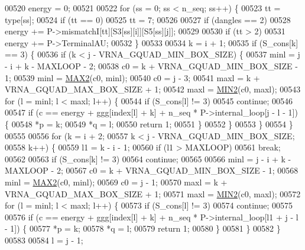 \begin{DoxyCode}
00520   energy  = 0;
00521 
00522   \textcolor{keywordflow}{for} (ss = 0; ss < n\_seq; ss++) \{
00523     tt = type[ss];
00524     \textcolor{keywordflow}{if} (tt == 0)
00525       tt = 7;
00526 
00527     \textcolor{keywordflow}{if} (dangles == 2)
00528       energy += P->mismatchI[tt][S3[ss][i]][S5[ss][j]];
00529 
00530     \textcolor{keywordflow}{if} (tt > 2)
00531       energy += P->TerminalAU;
00532   \}
00533 
00534   k = i + 1;
00535   \textcolor{keywordflow}{if} (S\_cons[k] == 3) \{
00536     \textcolor{keywordflow}{if} (k < j - VRNA\_GQUAD\_MIN\_BOX\_SIZE) \{
00537       minl  = j - i + k - MAXLOOP - 2;
00538       c0    = k + VRNA\_GQUAD\_MIN\_BOX\_SIZE - 1;
00539       minl  = \hyperlink{group__utils_ga33297b3679c713b0c4d897cd0fe3b122}{MAX2}(c0, minl);
00540       c0    = j - 3;
00541       maxl  = k + VRNA\_GQUAD\_MAX\_BOX\_SIZE + 1;
00542       maxl  = \hyperlink{group__utils_gae0b9cd0ce090bd69b951aa73e8fa4f7d}{MIN2}(c0, maxl);
00543       \textcolor{keywordflow}{for} (l = minl; l < maxl; l++) \{
00544         \textcolor{keywordflow}{if} (S\_cons[l] != 3)
00545           \textcolor{keywordflow}{continue};
00546 
00547         \textcolor{keywordflow}{if} (c == energy + ggg[index[l] + k] + n\_seq * P->internal\_loop[j - l - 1]) \{
00548           *p  = k;
00549           *q  = l;
00550           \textcolor{keywordflow}{return} 1;
00551         \}
00552       \}
00553     \}
00554   \}
00555 
00556   \textcolor{keywordflow}{for} (k = i + 2;
00557        k < j - VRNA\_GQUAD\_MIN\_BOX\_SIZE;
00558        k++) \{
00559     l1 = k - i - 1;
00560     \textcolor{keywordflow}{if} (l1 > MAXLOOP)
00561       \textcolor{keywordflow}{break};
00562 
00563     \textcolor{keywordflow}{if} (S\_cons[k] != 3)
00564       \textcolor{keywordflow}{continue};
00565 
00566     minl  = j - i + k - MAXLOOP - 2;
00567     c0    = k + VRNA\_GQUAD\_MIN\_BOX\_SIZE - 1;
00568     minl  = \hyperlink{group__utils_ga33297b3679c713b0c4d897cd0fe3b122}{MAX2}(c0, minl);
00569     c0    = j - 1;
00570     maxl  = k + VRNA\_GQUAD\_MAX\_BOX\_SIZE + 1;
00571     maxl  = \hyperlink{group__utils_gae0b9cd0ce090bd69b951aa73e8fa4f7d}{MIN2}(c0, maxl);
00572     \textcolor{keywordflow}{for} (l = minl; l < maxl; l++) \{
00573       \textcolor{keywordflow}{if} (S\_cons[l] != 3)
00574         \textcolor{keywordflow}{continue};
00575 
00576       \textcolor{keywordflow}{if} (c == energy + ggg[index[l] + k] + n\_seq * P->internal\_loop[l1 + j - l - 1]) \{
00577         *p  = k;
00578         *q  = l;
00579         \textcolor{keywordflow}{return} 1;
00580       \}
00581     \}
00582   \}
00583 
00584   l = j - 1;

\end{DoxyCode}
